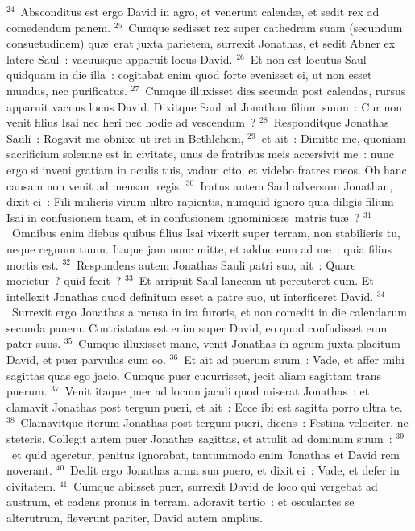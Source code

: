 ${}^{24}$~Absconditus est ergo David in agro, et venerunt calend\ae , et sedit rex ad comedendum panem.
${}^{25}$~Cumque sedisset rex super cathedram suam (secundum consuetudinem) qu\ae\ erat juxta parietem, surrexit Jonathas, et sedit Abner ex latere Saul~: vacuusque apparuit locus David.
${}^{26}$~Et non est locutus Saul quidquam in die illa~: cogitabat enim quod forte evenisset ei, ut non esset mundus, nec purificatus.
${}^{27}$~Cumque illuxisset dies secunda post calendas, rursus apparuit vacuus locus David. Dixitque Saul ad Jonathan filium suum~: Cur non venit filius Isai nec heri nec hodie ad vescendum~?
${}^{28}$~Responditque Jonathas Sauli~: Rogavit me obnixe ut iret in Bethlehem,
${}^{29}$~et ait~: Dimitte me, quoniam sacrificium solemne est in civitate, unus de fratribus meis accersivit me~: nunc ergo si inveni gratiam in oculis tuis, vadam cito, et videbo fratres meos. Ob hanc causam non venit ad mensam regis.
${}^{30}$~Iratus autem Saul adversum Jonathan, dixit ei~: Fili mulieris virum ultro rapientis, numquid ignoro quia diligis filium Isai in confusionem tuam, et in confusionem ignominios\ae\ matris tu\ae~?
${}^{31}$~Omnibus enim diebus quibus filius Isai vixerit super terram, non stabilieris tu, neque regnum tuum. Itaque jam nunc mitte, et adduc eum ad me~: quia filius mortis est.
${}^{32}$~Respondens autem Jonathas Sauli patri suo, ait~: Quare morietur~? quid fecit~?
${}^{33}$~Et arripuit Saul lanceam ut percuteret eum. Et intellexit Jonathas quod definitum esset a patre suo, ut interficeret David.
${}^{34}$~Surrexit ergo Jonathas a mensa in ira furoris, et non comedit in die calendarum secunda panem. Contristatus est enim super David, eo quod confudisset eum pater suus.
${}^{35}$~Cumque illuxisset mane, venit Jonathas in agrum juxta placitum David, et puer parvulus cum eo.
${}^{36}$~Et ait ad puerum suum~: Vade, et affer mihi sagittas quas ego jacio. Cumque puer cucurrisset, jecit aliam sagittam trans puerum.
${}^{37}$~Venit itaque puer ad locum jaculi quod miserat Jonathas~: et clamavit Jonathas post tergum pueri, et ait~: Ecce ibi est sagitta porro ultra te.
${}^{38}$~Clamavitque iterum Jonathas post tergum pueri, dicens~: Festina velociter, ne steteris. Collegit autem puer Jonath\ae\ sagittas, et attulit ad dominum suum~:
${}^{39}$~et quid ageretur, penitus ignorabat, tantummodo enim Jonathas et David rem noverant.
${}^{40}$~Dedit ergo Jonathas arma sua puero, et dixit ei~: Vade, et defer in civitatem.
${}^{41}$~Cumque abiisset puer, surrexit David de loco qui vergebat ad austrum, et cadens pronus in terram, adoravit tertio~: et osculantes se alterutrum, fleverunt pariter, David autem amplius.
